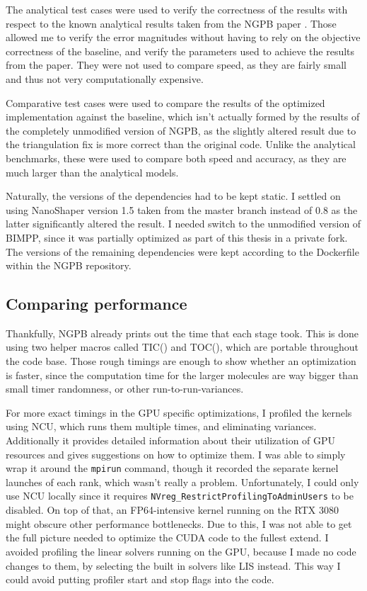 The analytical test cases were used to verify the correctness of the results with respect to the known analytical results taken from the NGPB paper \cite{diflorio2025nextgenpb}. 
Those allowed me to verify the error magnitudes without having to rely on the objective correctness of the baseline, and verify the parameters used to achieve the results from the paper. 
They were not used to compare speed, as they are fairly small and thus not very computationally expensive.

Comparative test cases were used to compare the results of the optimized implementation against the baseline, which isn't actually formed by the results of the completely unmodified version of NGPB, as the slightly altered result due to the triangulation fix is more correct than the original code.
Unlike the analytical benchmarks, these were used to compare both speed and accuracy, as they are much larger than the analytical models.

Naturally, the versions of the dependencies had to be kept static. I settled on using NanoShaper version 1.5 taken from the master branch instead of 0.8 as the latter significantly altered the result. 
I needed switch to the unmodified version of BIMPP, since it was partially optimized as part of this thesis in a private fork. 
The versions of the remaining dependencies were kept according to the Dockerfile within the NGPB repository.

\subsection{Comparing performance}
\label{sec:evaluation-experimental-setup-comparing-speed}

Thankfully, NGPB already prints out the time that each stage took. 
This is done using two helper macros called TIC() and TOC(), which are portable throughout the code base. 
Those rough timings are enough to show whether an optimization is faster, since the computation time for the larger molecules are way bigger than small timer randomness, or other run-to-run-variances. 

For more exact timings in the GPU specific optimizations, I profiled the kernels using NCU, which runs them multiple times, and eliminating variances.
Additionally it provides detailed information about their utilization of GPU resources and gives suggestions on how to optimize them. 
I was able to simply wrap it around the \texttt{mpirun} command, though it recorded the separate kernel launches of each rank, which wasn't really a problem. 
Unfortunately, I could only use NCU locally since it requires \texttt{NVreg\_RestrictProfilingToAdminUsers} to be disabled.
On top of that, an FP64-intensive kernel running on the RTX 3080 might obscure other performance bottlenecks.
Due to this, I was not able to get the full picture needed to optimize the CUDA code to the fullest extend.
I avoided profiling the linear solvers running on the GPU, because I made no code changes to them, by selecting the built in solvers like LIS instead. 
This way I could avoid putting profiler start and stop flags into the code.


